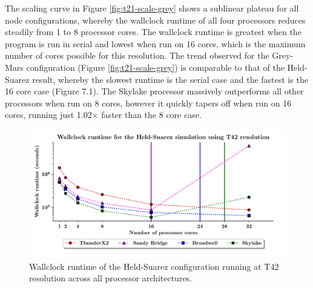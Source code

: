 \documentclass[a4paper,11pt]{report}
\begin{document}
The scaling curve in Figure \ref{fig:t21-scale-grey} shows a sublinear plateau for all node configurations, whereby the wallclock runtime of all four processors reduces steadily from 1 to 8 processor cores. The wallclock runtime is greatest when the program is run in serial and lowest when run on 16 cores, which is the maximum number of cores possible for this resolution. The trend observed for the Grey-Mars configuration (Figure \ref{fig:t21-scale-grey}) is comparable to that of the Held-Suarez result, whereby the slowest runtime is the serial case and the fastest is the 16 core case (Figure 7.1). The Skylake processor massively outperforms all other processors when run on 8 cores, however it quickly tapers off when run on 16 cores, running just 1.02$\times$ faster than the 8 core case.
\par
\begin{figure}[htbp]
\begin{center}
\includegraphics[width=1\textwidth]{img/scaling_graph_T42_Held_suarez.pdf}
\caption[Wallclock runtime of the Held-Suarez configuration running at T42 resolution]{Wallclock runtime of the Held-Suarez configuration running at T42 resolution across all processor architectures.}
\label{fig:t42-scale}
\end{center}
\end{figure}
\end{document}
